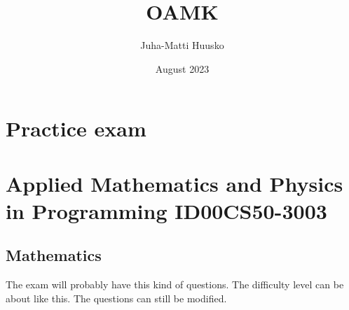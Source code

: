 \documentclass[12pt]{article}
\title{OAMK}
\author{Juha-Matti Huusko}
\date{August 2023}
\begin{document}
\thispagestyle{empty}

\section{Practice exam}
\section{Applied Mathematics and Physics in Programming ID00CS50-3003}
\subsection{Mathematics}

The exam will probably have this kind of questions. The difficulty level can be about like this. The questions can still be modified.
\end{document}
